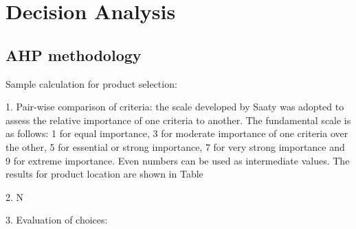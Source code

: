 \section{Decision Analysis}
\label{app:matrix}

\subsection{AHP methodology}
Sample calculation for product selection:

1. Pair-wise comparison of criteria: the scale developed by Saaty was adopted to assess the relative importance of one criteria to another. The fundamental scale is as follows: 1 for equal importance, 3 for moderate importance of one criteria over the other, 5 for essential or strong importance, 7 for very strong importance and 9 for extreme importance. Even numbers can be used as intermediate values. The results for product location are shown in Table

2. N

3. Evaluation of choices:

